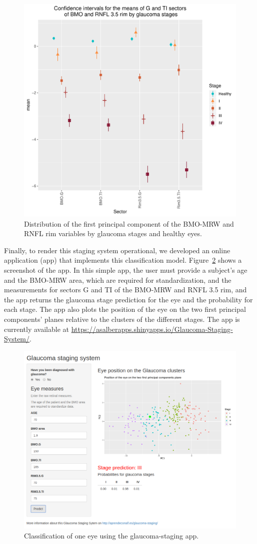 \documentclass[fleqn,10pt]{wlscirep}
\begin{document}
\begin{figure}[ht]
\centering
\includegraphics[width=0.5\linewidth]{img/confidence-intervals-bmo-35-G-TI-stages.pdf}
\caption{Distribution of the first principal component of the BMO-MRW and RNFL rim variables by glaucoma stages and healthy eyes.}
\label{fig:confidence-intervals}
\end{figure}

Finally, to render this staging system operational, we developed an online application (app) that implements this classification model. Figure~\ref{fig:glaucoma-app} shows a screenshot of the app. In this simple app, the user must provide a subject’s age and the BMO-MRW area, which are required for standardization, and the measurements for sectors G and TI of the BMO-MRW and RNFL 3.5 rim, and the app returns the glaucoma stage prediction for the eye and the probability for each stage. The app also plots the position of the eye on the two first principal components’ planes relative to the clusters of the different stages. The app is currently available at \url{https://asalberapps.shinyapps.io/Glaucoma-Staging-System/}.

\begin{figure}[ht]
\centering
\includegraphics[width=0.8\linewidth]{img/glaucoma-staging-app.png}
\caption{Classification of one eye using the glaucoma-staging app.}
\label{fig:glaucoma-app}
\end{figure}
\end{document}
